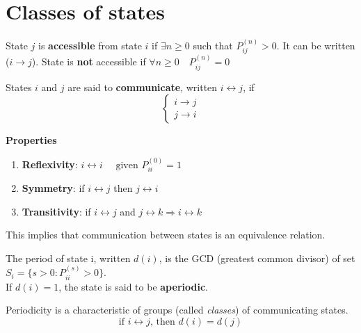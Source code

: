 \section{Classes of states}
	\begin{definition}
		State $j$ is {\bfseries accessible} from state $i$ if $\exists n \geq 0$ such that $P_{ij}^{(n)} > 0$. It can be written ($i \rightarrow j$).
		State is \textbf{not} accessible if $\forall n \ge 0 \quad P_{ij}^{(n)}=0$
	\end{definition}

	\begin{definition}
		States $i$ and $j$ are said to {\bfseries communicate}, written $ i \leftrightarrow j$, if
		$$\begin{cases}
			i \rightarrow j \\
			j \rightarrow i
		\end{cases}$$
	\end{definition}

	{\bfseries Properties}
	\begin{enumerate}
		\item \textbf{Reflexivity}: \quad $i \leftrightarrow i \quad\text{ given } P_{ii}^{(0)}=1$
		\item \textbf{Symmetry}: \quad if $i \leftrightarrow j$ then $j \leftrightarrow i$
		\item \textbf{Transitivity}: \quad if $i \leftrightarrow j$ and $j \leftrightarrow k \Rightarrow i \leftrightarrow k$
	\end{enumerate}
	This implies that communication between states is an equivalence relation.

	\begin{definition}[Periodicity]
		The period of state i, written $d(i)$, is the GCD (greatest common divisor) of set $S_i = \{ s>0 : P_{ii}^{(s)} >0 \}$.\\
		If $d(i)=1$, the state is said to be \textbf{aperiodic}.
	\end{definition}

	\begin{theorem}[Periodicity] Periodicity is a characteristic of groups (called \emph{classes}) of communicating states.
		$$\text{if } i \leftrightarrow j \text{, then } d(i) = d(j)$$
	\end{theorem}


